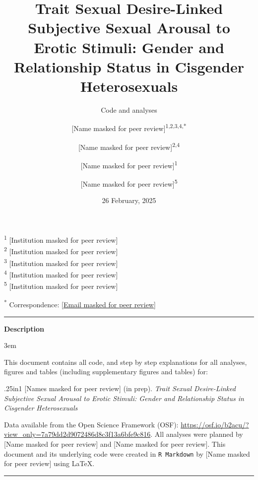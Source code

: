 \documentclass[
  bookmarksnumbered]{article}
\title{Trait Sexual Desire-Linked Subjective Sexual Arousal to Erotic Stimuli: Gender and Relationship Status in Cisgender Heterosexuals}
\subtitle{Code and analyses}
\author{{[}Name masked for peer review{]}\textsuperscript{1,2,3,4,*} \and {[}Name masked for peer review{]}\textsuperscript{2,4} \and {[}Name masked for peer review{]}\textsuperscript{1} \and {[}Name masked for peer review{]}\textsuperscript{5}}
\date{26 February, 2025}
\begin{document}
\maketitle

\textsuperscript{1} {[}Institution masked for peer review{]}\\
\textsuperscript{2} {[}Institution masked for peer review{]}\\
\textsuperscript{3} {[}Institution masked for peer review{]}\\
\textsuperscript{4} {[}Institution masked for peer review{]}\\
\textsuperscript{5} {[}Institution masked for peer review{]}

\textsuperscript{*} Correspondence: \href{mailto:\%5BEmail\%20masked\%20for\%20peer\%20review\%5D}{{[}Email masked for peer review{]}}

\begin{center}\rule{0.5\linewidth}{0.5pt}\end{center}

\begin{center}
\textbf{Description}
\end{center}

\par
\begingroup
\leftskip3em
\rightskip\leftskip

This document contains all code, and step by step explanations for all analyses, figures and tables (including supplementary figures and tables) for:

\begin{hangparas}{.25in}{1}
[Names masked for peer review] (in prep). \textit{Trait Sexual Desire-Linked Subjective Sexual Arousal to Erotic Stimuli: Gender and Relationship Status in Cisgender Heterosexuals}
\end{hangparas}

Data available from the Open Science Framework (OSF): \url{https://osf.io/b2acu/?view_only=7a79dd2d9072486d8c3f13a6bfe9c816}. All analyses were planned by {[}Name masked for peer review{]} and {[}Name masked for peer review{]}. This document and its underlying code were created in \texttt{R\ Markdown} by {[}Name masked for peer review{]} using \LaTeX.

\begin{center}\rule{0.5\linewidth}{0.5pt}\end{center}

\par
\endgroup

{\hypersetup{hidelinks}
\setcounter{tocdepth}{6}
\tableofcontents
}
\opensupplement
\end{document}
